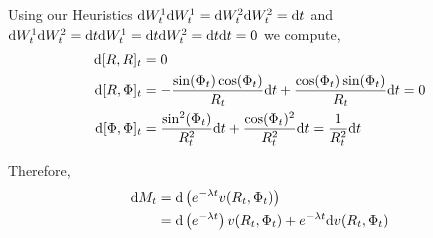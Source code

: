 \begin{solution}[Solution]
\begin{enumerate}[label=(\alph*)]
        Using our Heuristics \( \mathrm{d} W_t^1 \mathrm{d} W_t^1 = \mathrm{d} W_t^2 \mathrm{d} W_t^2 = \mathrm{d} t \) and \( \mathrm{d} W_t^1 \mathrm{d} W_t^2 = \mathrm{d} t\mathrm{d} W_t^1 = \mathrm{d} t \mathrm{d} W_t^2 = \mathrm{d} t \mathrm{d} t = 0 \) we compute,
        \begin{align*}
            \d[R,R]_t &= 0 \\ %
            \d[R,\Phi]_t &=  - \frac{\sin(\Phi_t)\cos(\Phi_t)}{R_t}\d t + \frac{\cos(\Phi_t)\sin(\Phi_t)}{R_t}\d t = 0\\
            \d[\Phi,\Phi]_t &= \frac{\sin^2(\Phi_t)}{R_t^2}\d t + \frac{\cos(\Phi_t)^2}{R_t^2}\d t = \frac{1}{R_t^2}\d t
        \end{align*}
        

        Therefore,
        \begin{align*}
            \mathrm{d} M_t &= \mathrm{d} \left( e^{-\lambda t} v(R_t,\Phi_t) \right) \\
            &= \mathrm{d} \left( e^{-\lambda t} \right) v(R_t,\Phi_t) + e^{-\lambda t} \mathrm{d} v(R_t,\Phi_t)
        \end{align*}
        \fi

\iffalse
        Therefore,
        \begin{align*}
            \d u(R_t,\Phi_t) &= \partial_r u(R_t,\Phi_t) \d R_t + \partial_\phi u(R_t,\Phi_t) \d \Phi_t
            \\& \hspace{3em}+ \frac{1}{2} \big( \partial_r^2 u (R_t,\Phi_t) \d[R,R]_t + 2\partial_{r\phi} u(R_t,\Phi_t) \d[R,\Phi]_t 
            \\&\hspace{6em}+ \partial_{\phi}^2 u(R,\Phi)\d[\Phi,\Phi]_t \big)
            \\&= \left( \frac{1}{2R_t}\partial_r + \frac{1}{2} \frac{1}{R^2}\partial_\phi^2  \right)u(R_t,\Phi_t)\d t + (\cdots)\d W_t^1 + (\cdots)\d W_t^2
        \end{align*}
        
        Since \( u(R_t,\Phi_t) \) is a martingale, the \( \d t \) term must be zero. Therefore,
        \begin{align*}
            \left( \frac{1}{r} \partial_r + \frac{1}{r^2}\partial_\phi^2  \right) u(r,\phi) = 0
        \end{align*}
        
        We have boundary conditions,
        \begin{align*}
            u(r,0) = u(r,\pi/2) = f(r)
        \end{align*}
        \fi 



\end{enumerate}
\end{solution}
